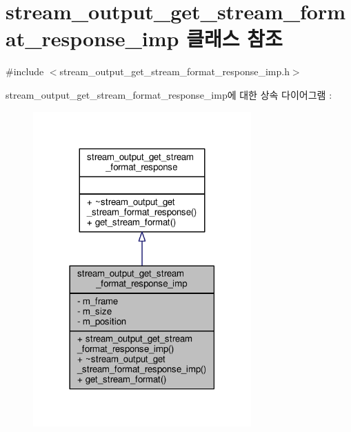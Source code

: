 \hypertarget{classavdecc__lib_1_1stream__output__get__stream__format__response__imp}{}\section{stream\+\_\+output\+\_\+get\+\_\+stream\+\_\+format\+\_\+response\+\_\+imp 클래스 참조}
\label{classavdecc__lib_1_1stream__output__get__stream__format__response__imp}


{\ttfamily \#include $<$stream\+\_\+output\+\_\+get\+\_\+stream\+\_\+format\+\_\+response\+\_\+imp.\+h$>$}



stream\+\_\+output\+\_\+get\+\_\+stream\+\_\+format\+\_\+response\+\_\+imp에 대한 상속 다이어그램 \+: 
\nopagebreak
\begin{figure}[H]
\begin{center}
\leavevmode
\includegraphics[width=237pt]{classavdecc__lib_1_1stream__output__get__stream__format__response__imp__inherit__graph}
\end{center}
\end{figure}


